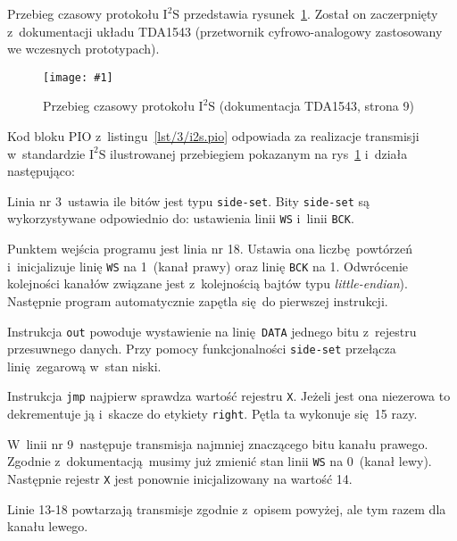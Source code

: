 \documentclass[polish]{aghengthesis}
\let\tempone\itemize
\let\temptwo\enditemize
\renewenvironment{itemize}{\tempone\setlength{\itemsep}{0cm}}{\temptwo}
\newcommand{\imgint}[4]{
	\begin{figure}[{#4}]
		\centering
		\texttt{[image: \#1]}
		\caption{#2}
		\label{#1}
	\end{figure}
}
\newcommand{\imgh}[3]{\imgint{#1}{#2}{#3}{H}}
\newcommand{\isqs}{$\text{I}^{2}\text{S}$}
\newcommand{\sset}{\lstinline|side-set|}
\newcommand{\lstfile}[3]{
	\noindent
	\hspace{0.1\linewidth}
	\begin{minipage}{0.8\linewidth}
		
	\end{minipage}
	\vspace{0.3cm}
}
\begin{document}
			Przebieg czasowy protokołu \isqs{} przedstawia rysunek~\ref{3/pio_i2s_docs}.
			Został on zaczerpnięty z~dokumentacji układu TDA1543 (przetwornik cyfrowo-analogowy zastosowany we wczesnych prototypach).
			\imgh{3/pio_i2s_docs}{Przebieg czasowy protokołu \isqs{} (dokumentacja TDA1543\textsuperscript{\cite{tda_pdf}}, strona 9)}{0.9}
			
			
			\lstfile{pio}{Kod programu \isqs{}}{lst/3/i2s.pio}
			
			\noindent
			Kod bloku PIO z~listingu~\ref{lst/3/i2s.pio} odpowiada za realizacje transmisji w~standardzie \isqs{} ilustrowanej przebiegiem pokazanym na rys~\ref{3/pio_i2s_docs} i~działa następująco:
			\begin{itemize}
				\item Linia nr 3~ustawia ile bitów jest typu \lstinline|side-set|. Bity \lstinline|side-set| są wykorzystywane odpowiednio do: ustawienia linii \lstinline|WS| i~linii \lstinline|BCK|.
				
				\item Punktem wejścia programu jest linia nr 18. Ustawia ona liczbę powtórzeń i~inicjalizuje linię \lstinline|WS| na 1~(kanał prawy) oraz linię \lstinline|BCK| na 1. Odwrócenie kolejności kanałów związane jest z~kolejnością bajtów typu \textit{little-endian}). Następnie program automatycznie zapętla się do pierwszej instrukcji.
				
				\item Instrukcja \lstinline|out| powoduje wystawienie na linię \lstinline|DATA| jednego bitu z~rejestru przesuwnego danych. Przy pomocy funkcjonalności \sset{} przełącza linię zegarową w~stan niski.
				
				\item Instrukcja \lstinline|jmp| najpierw sprawdza wartość rejestru \lstinline|X|. Jeżeli jest ona niezerowa to dekrementuje ją i~skacze do etykiety \lstinline|right|. Pętla ta wykonuje się 15 razy.
				
				\item W~linii nr 9~następuje transmisja najmniej znaczącego bitu kanału prawego. Zgodnie z~dokumentacją musimy już zmienić stan linii \lstinline|WS| na 0~(kanał lewy). Następnie rejestr \lstinline|X| jest ponownie inicjalizowany na wartość 14.
				
				\item Linie 13-18 powtarzają transmisje zgodnie z~opisem powyżej, ale tym razem dla kanału lewego.
			\end{itemize}
			
\end{document}

